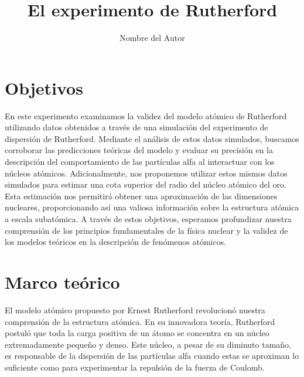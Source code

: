 \documentclass[twocolumn,a4paper,11pt]{scrartcl}
\title{El experimento de Rutherford}
\author{Nombre del Autor}
\date{}
\begin{document}

\section{Objetivos}
En este experimento examinamos la validez del modelo atómico de Rutherford utilizando datos obtenidos a través de una simulación del experimento de dispersión de Rutherford. Mediante el análisis de estos datos simulados, buscamos corroborar las predicciones teóricas del modelo y evaluar su precisión en la descripción del comportamiento de las partículas alfa al interactuar con los núcleos atómicos. Adicionalmente, nos proponemos utilizar estos mismos datos simulados para estimar una cota superior del radio del núcleo atómico del oro. Esta estimación nos permitirá obtener una aproximación de las dimensiones nucleares, proporcionando así una valiosa información sobre la estructura atómica a escala subatómica. A través de estos objetivos, esperamos profundizar nuestra comprensión de los principios fundamentales de la física nuclear y la validez de los modelos teóricos en la descripción de fenómenos atómicos.

\section{Marco teórico}
El modelo atómico propuesto por Ernest Rutherford revolucionó nuestra comprensión de la estructura atómica. En su innovadora teoría, Rutherford postuló que toda la carga positiva de un átomo se concentra en un núcleo extremadamente pequeño y denso. Este núcleo, a pesar de su diminuto tamaño, es responsable de la dispersión de las partículas alfa cuando estas se aproximan lo suficiente como para experimentar la repulsión de la fuerza de Coulomb.
\end{document}
